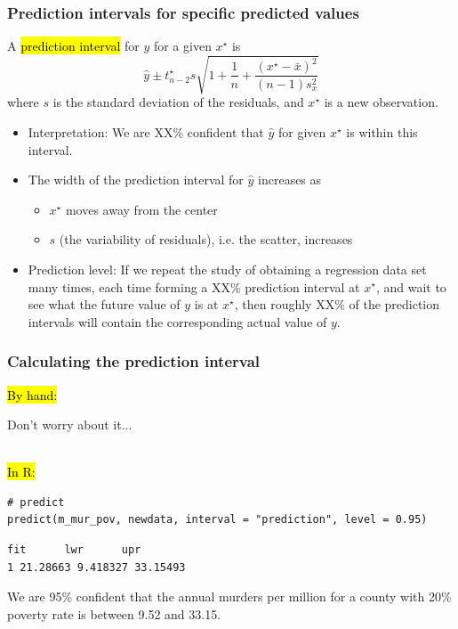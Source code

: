 \documentclass[slidestop,compress,mathserif,12pt,t,professionalfonts,xcolor=table]{beamer}
\begin{document}
\begin{frame}
\frametitle{Prediction intervals for specific predicted values}

A \hl{prediction interval} for $y$ for a given $x^\star$ is
\[ \hat{y} \pm t^\star_{n - 2} s \sqrt{ 1 + \frac{1}{n} + \frac{(x^\star - \bar{x})^2}{(n - 1)s_x^2} } \]
where $s$ is the standard deviation of the residuals, and $x^\star$ is a new observation.

\pause

\begin{itemize}

\item Interpretation: We are XX\% confident that $\hat{y}$ for given $x^\star$ is within this interval.

\pause

\item The width of the prediction interval for $\hat{y}$ increases as
\begin{itemize}
\item $x^\star$ moves away from the center
\item $s$ (the variability of residuals), i.e. the scatter, increases
\end{itemize}

\pause

\item Prediction level: If we repeat the study of obtaining a regression data set many times, each time forming a XX\% prediction 
interval at $x^\star$, and wait to see what the future value of $y$ is at $x^\star$, then roughly XX\% of the prediction intervals will 
contain the corresponding actual value of $y$.

\end{itemize}

\end{frame}


\begin{frame}[fragile]
\frametitle{Calculating the prediction interval}

\hl{By hand:}

Don't worry about it...

\pause

$\:$ \\

\hl{In R:}

{\scriptsize
\begin{Verbatim}[frame=single, formatcom=\color{blue}]
# predict
predict(m_mur_pov, newdata, interval = "prediction", level = 0.95)
\end{Verbatim}
}

\pause

{\scriptsize
\begin{Verbatim}[frame=single, formatcom=\color{gray}]
       fit      lwr      upr
1 21.28663 9.418327 33.15493
\end{Verbatim}
}

\pause

We are 95\% confident that the annual murders per million for a county with 20\%
poverty rate is between 9.52 and 33.15.

\end{frame}
\end{document}
